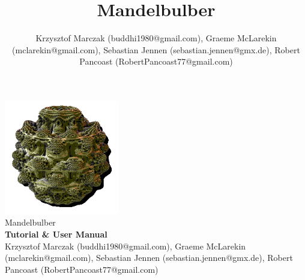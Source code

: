 % 
%




\newcommand{\mTitle}{Mandelbulber}
\newcommand{\mSubtitle}{Tutorial \& User Manual}
\newcommand{\mVersionDocument}{0.9.1 22nd, September 2016}
\newcommand{\mVersionMandelbulber}{2.0.9}
\newcommand{\mAuthor}{Krzysztof Marczak (buddhi1980@gmail.com), Graeme McLarekin (mclarekin@gmail.com),
	Sebastian Jennen (sebastian.jennen@gmx.de), Robert Pancoast (RobertPancoast77@gmail.com)}


\title{\mTitle}
\author{\mAuthor}




\begin{titlepage}
	\begin{center}
		\vspace{1.5cm}
			\includegraphics[width=5cm]{img/mandelbulber_logo.png} \\
		\vspace{1.5cm}
		\Huge{\mTitle}\\
		\textbf{\mSubtitle}\\
		\vspace{2cm}
		\small{\mAuthor}\\
		\vspace{2cm}
		
	\end{center}
	\normalsize
	\vfill
\end{titlepage}

\setcounter{page}{1}
\tableofcontents
\newpage


\setcounter{page}{1}






